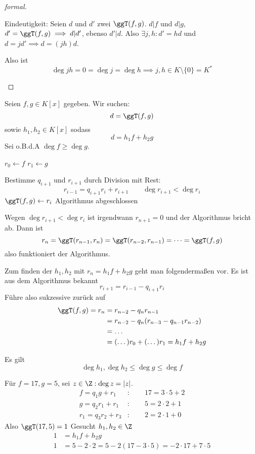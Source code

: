 \documentclass{mycourse}
\begin{document}
\begin{prop}
\begin{proof}[formal]
\begin{seg}{Eindeutigkeit:}
Seien $d$ und $d'$ zwei $\ggT(f,g)$.
$d|f$ und $d|g$, $d'=\ggT(f,g) \implies d|d'$, ebenso $d'|d$.
Also $\exists j,h: d'=hd$ und $d=jd' \implies d=(jh)d$.

Also ist
\[
\deg jh = 0 = \deg j = \deg h \implies j,h\in K\setminus \{0\}=K^*
\]
\end{seg}

\end{proof}


\end{prop}

\begin{alg*} 
Seien $f,g\in K[x]$ gegeben.
Wir suchen:
\[
d=\ggT(f,g)
\]
sowie $h_1,h_2\in K[x]$ sodass
\[
	d=h_1f+h_2g
\]
Sei o.B.d.A $\deg f \ge \deg g$.

\begin{algorithmic}
	\State $r_0 \gets f$
	\State $r_1 \gets g$

		\State Bestimme $q_{i+1}$ und $r_{i+1}$ durch Division mit Rest: 
			\[
				r_{i-1} = q_{i+1}r_i + r_{i+1} \qquad \deg r_{i+1} < \deg r_{i}
			\]
			\State $\ggT(f,g) \gets r_i$
			\State Algorithmus abgeschlossen
		\EndIf
	\EndFor
\end{algorithmic}

Wegen $\deg r_{i+1} < \deg r_{i}$ ist irgendwann $r_{n+1} = 0$ und der Algorithmus bricht ab.
Dann ist
\[
	r_{n} = \ggT(r_{n-1},r_{n}) = \ggT(r_{n-2},r_{n-1}) = \dotsb = \ggT(f,g)
\]
also funktioniert der Algorithmus.

Zum finden der $h_1,h_2$ mit $r_n = h_1f + h_2g$ geht man folgendermaßen vor.
Es ist aus dem Algorithmus bekannt
\[
	r_{i+1} = r_{i-1} - q_{i+1}r_i 
\]
Führe also sukzessive zurück auf
\begin{align*}
	\ggT(f,g) = r_n &= r_{n-2} - q_nr_{n-1} \\
					&= r_{n-2} - q_n(r_{n-3} -q_{n-1}r_{n-2})\\
		&= \dotsc\\
	 &= (\dotso)r_0 + (\dotso)r_1 = h_1f + h_2g
\end{align*}

Es gilt 
\[
	\deg h_1,\deg h_2 \le \deg g \le \deg f
\]

\end{alg*}


\begin{ex}
Für $f=17, g=5$, sei $z\in \Z:\deg z=|z|$.
\begin{align*}
f= q_1g+r_1 &: \qquad 17 = 3\cdot 5 + 2\\
g=q_2r_1 +r_1&: \qquad 5 = 2\cdot 2 + 1\\
r_1=q_3r_2+r_3&: \qquad  2 = 2\cdot 1 + 0
\end{align*}
Also $\ggT(17,5)=1$
Gesucht $h_1,h_2\in \Z$
\begin{align*}
1 &=h_1f+h_2g\\
1 &=5-2\cdot 2=5-2(17-3\cdot 5)=- 2 \cdot 17+7 \cdot 5
\end{align*}


\end{ex}
\end{document}

